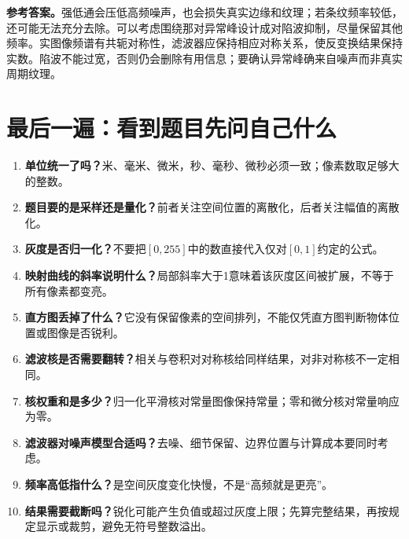 \textbf{参考答案。}强低通会压低高频噪声，也会损失真实边缘和纹理；若条纹频率较低，还可能无法充分去除。可以考虑围绕那对异常峰设计成对陷波抑制，尽量保留其他频率。实图像频谱有共轭对称性，滤波器应保持相应对称关系，使反变换结果保持实数。陷波不能过宽，否则仍会删除有用信息；要确认异常峰确来自噪声而非真实周期纹理。
\clearpage
\section{最后一遍：看到题目先问自己什么}
\begin{enumerate}
\item \textbf{单位统一了吗？}米、毫米、微米，秒、毫秒、微秒必须一致；像素数取足够大的整数。
\item \textbf{题目要的是采样还是量化？}前者关注空间位置的离散化，后者关注幅值的离散化。
\item \textbf{灰度是否归一化？}不要把$[0,255]$中的数直接代入仅对$[0,1]$约定的公式。
\item \textbf{映射曲线的斜率说明什么？}局部斜率大于1意味着该灰度区间被扩展，不等于所有像素都变亮。
\item \textbf{直方图丢掉了什么？}它没有保留像素的空间排列，不能仅凭直方图判断物体位置或图像是否锐利。
\item \textbf{滤波核是否需要翻转？}相关与卷积对对称核给同样结果，对非对称核不一定相同。
\item \textbf{核权重和是多少？}归一化平滑核对常量图像保持常量；零和微分核对常量响应为零。
\item \textbf{滤波器对噪声模型合适吗？}去噪、细节保留、边界位置与计算成本要同时考虑。
\item \textbf{频率高低指什么？}是空间灰度变化快慢，不是“高频就是更亮”。
\item \textbf{结果需要截断吗？}锐化可能产生负值或超过灰度上限；先算完整结果，再按规定显示或裁剪，避免无符号整数溢出。
\end{enumerate}
